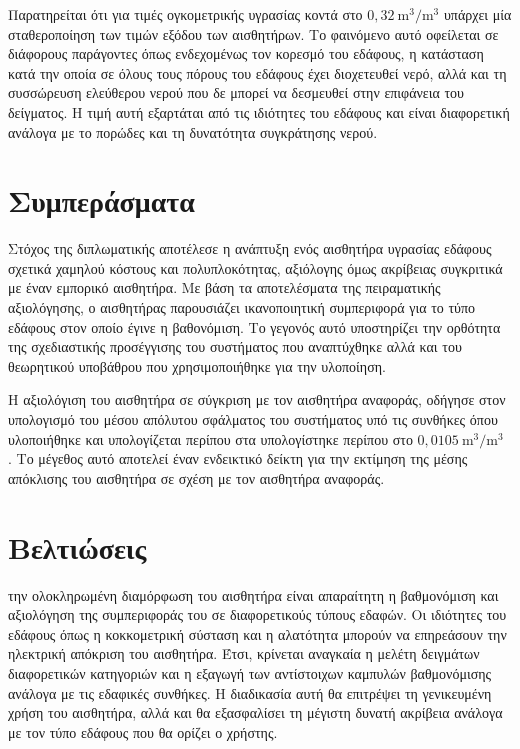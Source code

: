 Παρατηρείται ότι για τιμές ογκομετρικής υγρασίας κοντά στο \(0{,}32\ \mathrm{m^3/m^3}\) υπάρχει μία σταθεροποίηση των τιμών εξόδου των αισθητήρων. Το φαινόμενο αυτό οφείλεται σε διάφορους παράγοντες όπως ενδεχομένως τον κορεσμό του εδάφους, η κατάσταση κατά την οποία σε όλους τους πόρους του εδάφους έχει διοχετευθεί νερό, αλλά και τη συσσώρευση ελεύθερου νερού που δε μπορεί να δεσμευθεί στην επιφάνεια του δείγματος. Η τιμή αυτή εξαρτάται από τις ιδιότητες του εδάφους και είναι διαφορετική ανάλογα με το πορώδες και τη δυνατότητα συγκράτησης νερού.


\section{Συμπεράσματα}
Στόχος της διπλωματικής αποτέλεσε η ανάπτυξη ενός αισθητήρα υγρασίας εδάφους σχετικά χαμηλού κόστους και πολυπλοκότητας, αξιόλογης όμως ακρίβειας συγκριτικά με έναν εμπορικό αισθητήρα. Με βάση τα αποτελέσματα της πειραματικής αξιολόγησης, ο αισθητήρας παρουσιάζει ικανοποιητική συμπεριφορά για το τύπο εδάφους στον οποίο έγινε η βαθονόμιση. Το γεγονός αυτό υποστηρίζει την ορθότητα της σχεδιαστικής προσέγγισης του συστήματος που αναπτύχθηκε αλλά και του θεωρητικού υποβάθρου που χρησιμοποιήθηκε για την υλοποίηση.

\par Η αξιολόγιση του αισθητήρα σε σύγκριση με τον αισθητήρα αναφοράς, οδήγησε στον υπολογισμό του μέσου απόλυτου σφάλματος του συστήματος υπό τις συνθήκες όπου υλοποιήθηκε και υπολογίζεται περίπου στα υπολογίστηκε περίπου στο
\(0{,}0105\ \mathrm{m^3/m^3}\) . Το μέγεθος αυτό αποτελεί έναν ενδεικτικό δείκτη για την εκτίμηση της μέσης απόκλισης του αισθητήρα σε σχέση με τον αισθητήρα αναφοράς.





\section{Βελτιώσεις}

 την ολοκληρωμένη διαμόρφωση του αισθητήρα είναι απαραίτητη η βαθμονόμιση και αξιολόγηση της συμπεριφοράς του σε διαφορετικούς τύπους εδαφών. Οι ιδιότητες του εδάφους όπως η κοκκομετρική σύσταση και η αλατότητα μπορούν να επηρεάσουν την ηλεκτρική απόκριση του αισθητήρα. Έτσι, κρίνεται αναγκαία η μελέτη δειγμάτων διαφορετικών κατηγοριών και η εξαγωγή των αντίστοιχων καμπυλών βαθμονόμισης ανάλογα με τις εδαφικές συνθήκες. Η διαδικασία αυτή θα επιτρέψει τη γενικευμένη χρήση του αισθητήρα, αλλά και θα εξασφαλίσει τη μέγιστη δυνατή ακρίβεια ανάλογα με τον τύπο εδάφους που θα ορίζει ο χρήστης.

